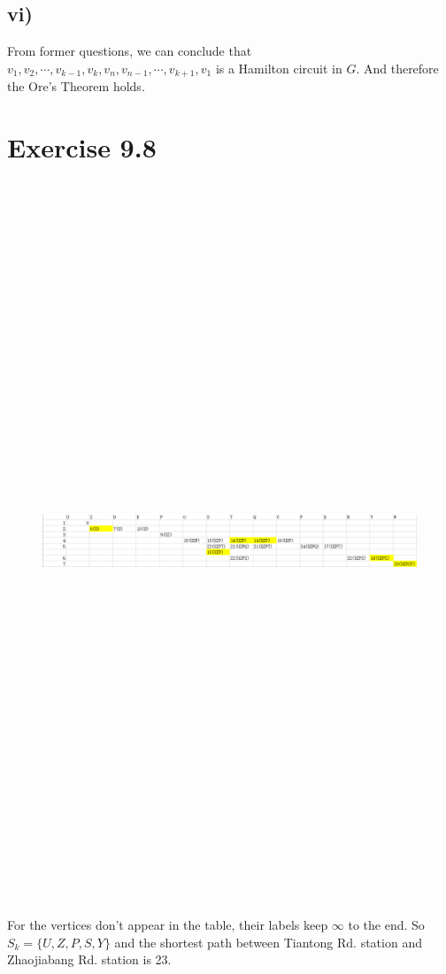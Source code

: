 \documentclass[a4paper,12pt,titlepage]{article}
\begin{document}
\subsection*{vi)}
From former questions, we can conclude that $v_1,v_2,\cdots,v_{k-1},v_k,v_n,v_{n-1},\cdots,v_{k+1},v_1$ is a Hamilton circuit in $G$. And therefore the Ore's Theorem holds.
\clearpage


\section*{Exercise 9.8}

\begin{figure}[H]
    \centering
    \includegraphics[angle=90,height=21.5cm]{8.png}
\end{figure}
For the vertices don't appear in the table, their labels keep $\infty$ to the end. So $S_k=\lbrace U,Z,P,S,Y\rbrace$ and the shortest path between Tiantong Rd. station and Zhaojiabang Rd. station is 23.
\end{document}
